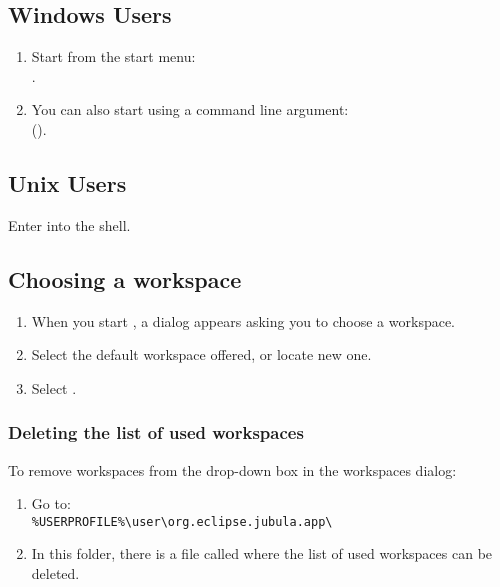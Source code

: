 

\subsection{Windows Users}
\begin{enumerate}
\item Start \jb{} from the start menu:\\
.

\item You can also start \jb{} using a command line argument:\\ 
(). 
\end{enumerate}

\subsection{Unix Users}
Enter  into the shell. 

\subsection{Choosing a workspace}
\begin{enumerate}
\item When you start \jb{}, a dialog appears asking you to choose a workspace. 
\item Select the default workspace offered, or locate new one. 
 \item Select .
 \end{enumerate}


\subsubsection{Deleting the list of used workspaces}
To remove workspaces from the drop-down box in the workspaces dialog:
\begin{enumerate}
\item Go to: \\
\verb+%USERPROFILE%\user\org.eclipse.jubula.app\  +
\item In this folder, there is a file called  where the list of used workspaces can be deleted. 
\end{enumerate}




